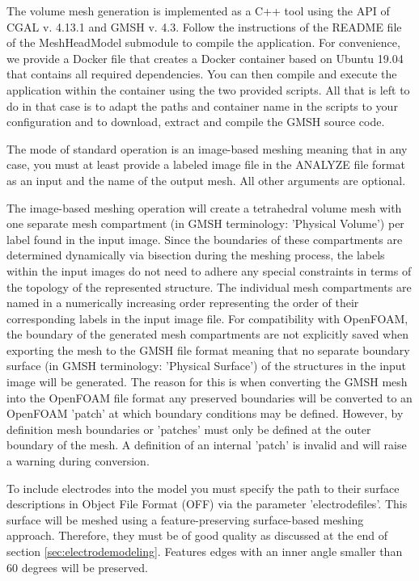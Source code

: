 The volume mesh generation is implemented as a C++ tool using the API of CGAL v. 4.13.1 and GMSH v. 4.3.
Follow the instructions of the README file of the MeshHeadModel submodule to compile the application.
For convenience, we provide a Docker file that creates a Docker container based on Ubuntu 19.04
that contains all required dependencies. You can then compile and execute the application within the container
using the two provided scripts. All that is left to do in that case is to adapt the paths and container name
in the scripts to your configuration and to download, extract and compile the GMSH source code.\par
The mode of standard operation is an image-based meshing meaning that in any case, you must at least provide a
labeled image file in the ANALYZE file format as an input and the name of the output mesh. All other arguments
are optional.\par
The image-based meshing operation will create a tetrahedral volume mesh with one separate mesh compartment
(in GMSH terminology: 'Physical Volume') per label found in the input image. Since the boundaries of these
compartments are determined dynamically via bisection during the meshing process, the labels within the 
input images do not need to adhere any special constraints in terms of the topology of the represented 
structure. The individual mesh compartments are named in a numerically increasing order representing the
order of their corresponding labels in the input image file. For compatibility with OpenFOAM, the boundary
of the generated mesh compartments are not explicitly saved when exporting the mesh to the GMSH file
format meaning that no separate boundary surface (in GMSH terminology: 'Physical Surface') of the structures
in the input image will be generated. The reason for this is when converting the GMSH mesh into the OpenFOAM file
format any preserved boundaries will be converted to an OpenFOAM 'patch' at which boundary conditions may be
defined. However, by definition mesh boundaries or 'patches' must only be defined at the outer boundary of
the mesh. A definition of an internal 'patch' is invalid and will raise a warning during conversion.\par
To include electrodes into the model you must specify the path to their surface descriptions in Object File 
Format (OFF) via the parameter 'electrodefiles'. This surface will be meshed using a feature-preserving 
surface-based meshing approach. Therefore, they must be of good quality as discussed at the end of section
\ref{sec:electrodemodeling}. Features edges with an inner angle smaller than 60 degrees will be preserved.
